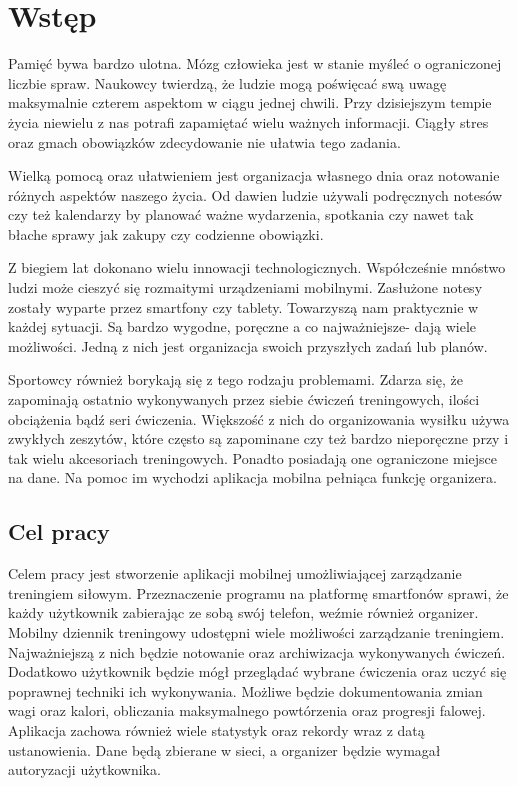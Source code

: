 \chapter[Wstęp.]{Wstęp}

Pamięć bywa bardzo ulotna. Mózg człowieka jest w stanie myśleć o ograniczonej liczbie spraw. Naukowcy twierdzą, że ludzie mogą poświęcać swą uwagę maksymalnie czterem aspektom w ciągu jednej chwili. Przy dzisiejszym tempie życia niewielu z nas potrafi zapamiętać wielu ważnych informacji. Ciągły stres oraz gmach obowiązków zdecydowanie nie ułatwia tego zadania.

Wielką pomocą oraz ułatwieniem jest organizacja własnego dnia oraz notowanie różnych aspektów naszego życia. Od dawien ludzie używali podręcznych notesów czy też kalendarzy by planować ważne wydarzenia, spotkania czy nawet tak błache sprawy jak zakupy czy codzienne obowiązki.

Z biegiem lat dokonano wielu innowacji technologicznych. Współcześnie mnóstwo ludzi może cieszyć się rozmaitymi urządzeniami mobilnymi. Zasłużone notesy zostały wyparte przez smartfony czy tablety. Towarzyszą nam praktycznie w każdej sytuacji. Są bardzo wygodne, poręczne a co najważniejsze- dają wiele możliwości. Jedną z nich jest organizacja swoich przyszłych zadań lub planów.

Sportowcy również borykają się z tego rodzaju problemami. Zdarza się, że zapominają ostatnio wykonywanych przez siebie ćwiczeń treningowych, ilości obciążenia bądź seri ćwiczenia. Większość z nich do organizowania wysiłku używa zwykłych zeszytów, które często są zapominane czy też bardzo nieporęczne przy i tak wielu akcesoriach treningowych. Ponadto posiadają one ograniczone miejsce na dane. Na pomoc im wychodzi aplikacja mobilna pełniąca funkcję organizera. 

\section{Cel pracy}

Celem pracy jest stworzenie aplikacji mobilnej umożliwiającej zarządzanie treningiem siłowym.
Przeznaczenie programu na platformę smartfonów sprawi, że każdy użytkownik zabierając ze sobą swój telefon, weźmie również organizer. Mobilny dziennik treningowy udostępni wiele możliwości zarządzanie treningiem. Najważniejszą z nich będzie notowanie oraz archiwizacja wykonywanych ćwiczeń. Dodatkowo użytkownik będzie mógł przeglądać wybrane ćwiczenia oraz uczyć się poprawnej techniki ich wykonywania. Możliwe będzie dokumentowania zmian wagi oraz kalori, obliczania maksymalnego powtórzenia oraz progresji falowej. Aplikacja zachowa również wiele statystyk oraz rekordy wraz z datą ustanowienia. Dane będą zbierane w sieci, a organizer będzie wymagał autoryzacji użytkownika.


